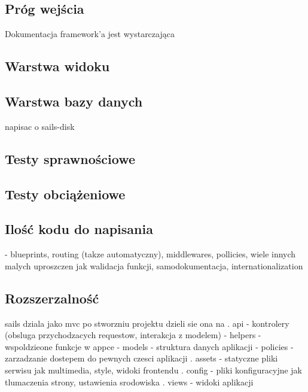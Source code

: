 \documentclass[12pt]{report}
\begin{document}
    \subsection{Próg wejścia}
    Dokumentacja framework'a jest wystarczająca

    \subsection{Warstwa widoku}
    \subsection{Warstwa bazy danych}
    napisac o sails-disk

    \subsection{Testy sprawnościowe}
    \subsection{Testy obciążeniowe}
    \subsection{Ilość kodu do napisania}

    - blueprints, routing (takze automatyczny), middlewares, pollicies, wiele innych malych uproszczen jak walidacja funkcji, samodokumentacja, internationalization

    \subsection{Rozszerzalność}
    sails dziala jako mvc
    po stworzniu projektu dzieli sie ona na
.    api 
    - kontrolery (obsluga przychodzacych requestow, interakcja z modelem)
  - helpers - wspoldzieone funkcje w appce
  - models - struktura danych aplikacji
  - policies - zarzadzanie dostepem do pewnych czesci aplikacji
. assets - statyczne pliki serwisu jak multimedia, style, widoki frontendu
. config - pliki konfiguracyjne jak tlumaczenia strony, ustawienia srodowiska
. views - widoki aplikacji
\end{document}
